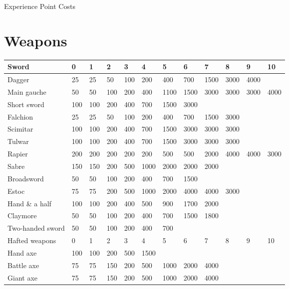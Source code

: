 \begin{Tables}{Experience Point Costs}

\section{Weapons}

\begingroup

\fontsize{10}{10pt}\selectfont

\begin{tabularx}{\linewidth}{Xlllllllllll} \hline
Sword			& 0	& 1	& 2	& 3	& 4	& 5	& 6	& 7	& 8	& 9	& 10	\\ \hline
Dagger			& 25	& 25	& 50	& 100	& 200	& 400	& 700	& 1500	& 3000	& 4000	& 	\\
Main gauche		& 50	& 50 	& 100	& 200	& 400	& 1100	& 1500	& 3000	& 3000	& 3000	& 4000	\\
Short sword		& 100	& 100 	& 200	& 400	& 700	& 1500	& 3000	& 	& 	& 	&  \\
Falchion		& 25	& 25 	& 50	& 100	& 200	& 400	& 700	& 1500	& 3000	& 	&  \\
Scimitar		& 100	& 100 	& 200	& 400	& 700	& 1500	& 3000	& 3000	& 3000	& 	&  \\
Tulwar			& 100	& 100 	& 200	& 400	& 700	& 1500	& 3000	& 3000	& 3000	& 	&  \\
Rapier			& 200	& 200 	& 200	& 200	& 200	& 500	& 500	& 2000	& 4000	& 4000	& 3000 \\
Sabre			& 150	& 150 	& 200	& 500	& 1000	& 2000	& 2000	& 2000	& 	& 	&  \\
Broadsword		& 50	& 50 	& 100	& 200	& 400	& 700	& 1500	& 	& 	& 	&  \\
Estoc			& 75	& 75 	& 200	& 500	& 1000	& 2000	& 4000	& 4000	& 3000	& 	&  \\
Hand \& a half		& 100	& 100 	& 200	& 400	& 500	& 900	& 1700	& 2000	& 	& 	&  \\
Claymore		& 50	& 50 	& 100	& 200	& 400	& 700	& 1500	& 1800	& 	& 	&  \\
Two-handed sword	& 50	& 50 	& 100	& 200	& 400	& 700	& 	& 	& 	& 	&  \\ \hline
Hafted weapons		& 0	& 1 	& 2	& 3	& 4	& 5	& 6	& 7	& 8	& 9	& 10 \\ \hline
Hand axe		& 100	& 100 	& 200	& 500	& 1500	& 	& 	& 	& 	& 	&  \\
Battle axe		& 75	& 75 	& 150	& 200	& 500	& 1000	& 2000	& 4000	& 	& 	&  \\
Giant axe		& 75	& 75 	& 150	& 200	& 500	& 1000	& 2000	& 4000	& 	& 	&  \\

\end{tabularx}
\end{Tables}
